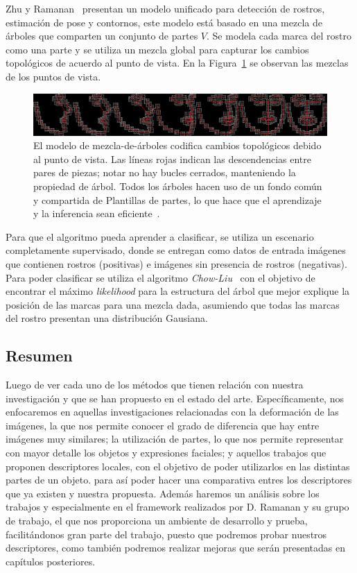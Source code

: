 Zhu y Ramanan~\cite{Zhu2012} presentan un modelo unificado para detección de rostros, estimación de pose y contornos, este modelo está basado en una mezcla de árboles que comparten un conjunto de partes $V$. Se modela cada marca del rostro como una parte y se utiliza un mezcla global para capturar los cambios topológicos de acuerdo al punto de vista. En la Figura~\ref{fig:m-view} se observan las mezclas de los puntos de vista.

\begin{figure}[tb]
 \centering
  \includegraphics[width=1\textwidth]{Figuras/viewpoints.jpg}
  \caption[Puntos de vista de un rostro]{El modelo de mezcla-de-árboles codifica cambios topológicos debido al punto de vista. Las líneas rojas indican las descendencias entre pares de piezas; notar no hay bucles cerrados, manteniendo la propiedad de árbol. Todos los árboles hacen uso de un fondo común y compartida de Plantillas de partes, lo que hace que el aprendizaje y la inferencia sean eficiente~\cite{Zhu2012}.}
  \label{fig:m-view}
\end{figure}

Para que el algoritmo pueda aprender a clasificar, se utiliza un escenario completamente supervisado, donde se entregan como datos de entrada imágenes que contienen rostros (positivas) e imágenes sin presencia de rostros (negativas). Para poder clasificar se utiliza el algoritmo \textit{Chow-Liu}~\cite{Chow1968} con el objetivo de encontrar el máximo \textit{likelihood} para la estructura del árbol que mejor explique la posición de las marcas para una mezcla dada, asumiendo que todas las marcas del rostro presentan una distribución Gausiana.

\subsection{Resumen}
Luego de ver cada uno de los métodos que tienen relación con nuestra investigación y que se han propuesto en el estado del arte. Específicamente, nos enfocaremos en aquellas investigaciones relacionadas con la deformación de las imágenes, la que nos permite conocer el grado de diferencia que hay entre imágenes muy similares; la utilización de partes, lo que nos permite representar con mayor detalle los objetos y expresiones faciales; y aquellos trabajos que proponen descriptores locales, con el objetivo de poder utilizarlos en las distintas partes de un objeto. para así poder hacer una comparativa entres los descriptores que ya existen y nuestra propuesta. Además haremos un análisis sobre los trabajos y especialmente en el framework realizados por D. Ramanan y su grupo de trabajo, el que nos proporciona un ambiente de desarrollo y prueba, facilitándonos gran parte del trabajo, puesto que podremos probar nuestros descriptores, como también podremos realizar mejoras que serán presentadas en capítulos posteriores.

